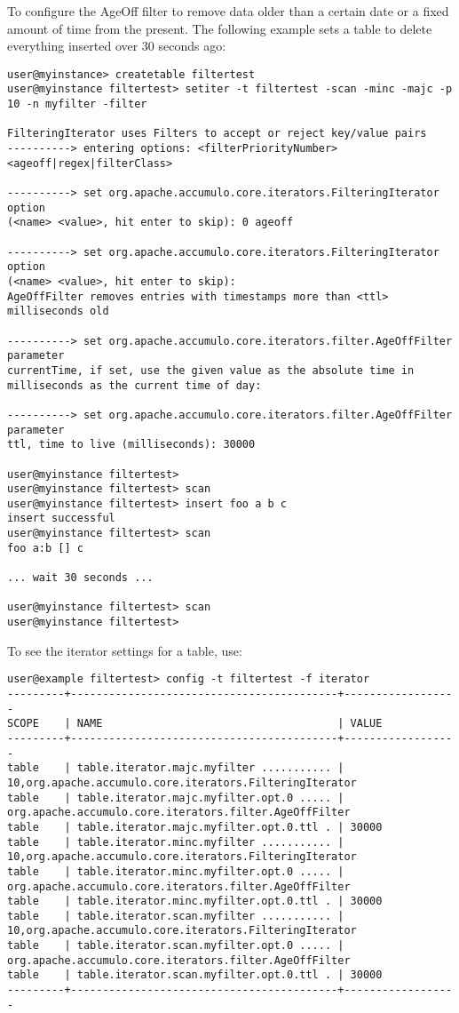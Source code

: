 To configure the AgeOff filter to remove data older than a certain date or a fixed
amount of time from the present. The following example sets a table to delete
everything inserted over 30 seconds ago:

\small
\begin{verbatim}
user@myinstance> createtable filtertest
user@myinstance filtertest> setiter -t filtertest -scan -minc -majc -p
10 -n myfilter -filter

FilteringIterator uses Filters to accept or reject key/value pairs
----------> entering options: <filterPriorityNumber>
<ageoff|regex|filterClass>

----------> set org.apache.accumulo.core.iterators.FilteringIterator option
(<name> <value>, hit enter to skip): 0 ageoff

----------> set org.apache.accumulo.core.iterators.FilteringIterator option
(<name> <value>, hit enter to skip):
AgeOffFilter removes entries with timestamps more than <ttl>
milliseconds old

----------> set org.apache.accumulo.core.iterators.filter.AgeOffFilter parameter
currentTime, if set, use the given value as the absolute time in
milliseconds as the current time of day:

----------> set org.apache.accumulo.core.iterators.filter.AgeOffFilter parameter
ttl, time to live (milliseconds): 30000

user@myinstance filtertest>
user@myinstance filtertest> scan
user@myinstance filtertest> insert foo a b c
insert successful
user@myinstance filtertest> scan
foo a:b [] c

... wait 30 seconds ...

user@myinstance filtertest> scan
user@myinstance filtertest>
\end{verbatim}
\normalsize

To see the iterator settings for a table, use:

\small
\begin{verbatim}
user@example filtertest> config -t filtertest -f iterator
---------+------------------------------------------+------------------
SCOPE    | NAME                                     | VALUE
---------+------------------------------------------+------------------
table    | table.iterator.majc.myfilter ........... |
10,org.apache.accumulo.core.iterators.FilteringIterator
table    | table.iterator.majc.myfilter.opt.0 ..... |
org.apache.accumulo.core.iterators.filter.AgeOffFilter
table    | table.iterator.majc.myfilter.opt.0.ttl . | 30000
table    | table.iterator.minc.myfilter ........... |
10,org.apache.accumulo.core.iterators.FilteringIterator
table    | table.iterator.minc.myfilter.opt.0 ..... |
org.apache.accumulo.core.iterators.filter.AgeOffFilter
table    | table.iterator.minc.myfilter.opt.0.ttl . | 30000
table    | table.iterator.scan.myfilter ........... |
10,org.apache.accumulo.core.iterators.FilteringIterator
table    | table.iterator.scan.myfilter.opt.0 ..... |
org.apache.accumulo.core.iterators.filter.AgeOffFilter
table    | table.iterator.scan.myfilter.opt.0.ttl . | 30000
---------+------------------------------------------+------------------
\end{verbatim}
\normalsize

